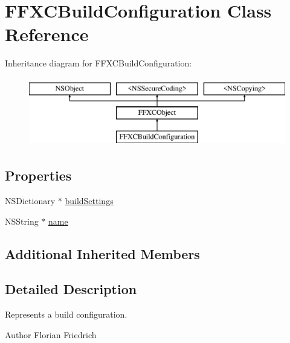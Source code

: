 \hypertarget{interface_f_f_x_c_build_configuration}{\section{F\-F\-X\-C\-Build\-Configuration Class Reference}
\label{interface_f_f_x_c_build_configuration}
}
Inheritance diagram for F\-F\-X\-C\-Build\-Configuration\-:\begin{figure}[H]
\begin{center}
\leavevmode
\includegraphics[height=3.000000cm]{interface_f_f_x_c_build_configuration}
\end{center}
\end{figure}
\subsection*{Properties}
\begin{DoxyCompactItemize}
\item 
N\-S\-Dictionary $\ast$ \hyperlink{interface_f_f_x_c_build_configuration_a54f1a8056f0436256553fca442d9fee8}{build\-Settings}
\item 
N\-S\-String $\ast$ \hyperlink{interface_f_f_x_c_build_configuration_a4b93d352d2fca75b34e1b5a50e03f587}{name}
\end{DoxyCompactItemize}
\subsection*{Additional Inherited Members}


\subsection{Detailed Description}
Represents a build configuration. \begin{DoxyAuthor}{Author}
Florian Friedrich 
\end{DoxyAuthor}


